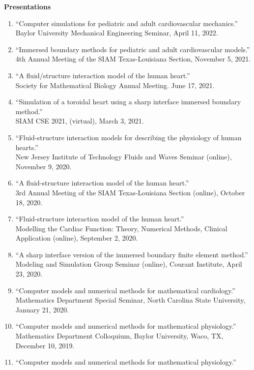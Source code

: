 \documentclass{article} %
\begin{document}
\vspace{0.5cm}
\noindent
{\bf \large Presentations}
\begin{enumerate}
\item ``Computer simulations for pediatric and adult cardiovascular mechanics.'' \\
Baylor University Mechanical Engineering Seminar, April 11, 2022.
\item ``Immersed boundary methods for pediatric and adult cardiovascular models.''\\
4th Annual Meeting of the SIAM Texas-Louisiana Section, November 5, 2021.
\item ``A fluid/structure interaction model of the human heart.'' \\
Society for Mathematical Biology Annual Meeting.  June 17, 2021.
\item ``Simulation of a toroidal heart using a sharp interface immersed boundary method.'' \\
SIAM CSE 2021, (virtual), March 3, 2021.
\item ``Fluid-structure interaction models for describing the physiology of human hearts.'' \\ New Jersey Institute of Technology Fluids and Waves Seminar (online), November 9, 2020.
\item ``A fluid-structure interaction model of the human heart.'' \\ 3rd Annual Meeting of the SIAM Texas-Louisiana Section (online), October 18, 2020.
\item ``Fluid-structure interaction model of the human heart.'' \\
Modelling the Cardiac Function: Theory, Numerical Methods, Clinical Application (online), September 2, 2020.
\item ``A sharp interface version of the immersed boundary finite element method.'' \\
Modeling and Simulation Group Seminar (online), Courant Institute, April 23, 2020.
\item ``Computer models and numerical methods for mathematical cardiology.'' \\
Mathematics Department Special Seminar, North Carolina State University, January 21, 2020.
\item ``Computer models and numerical methods for mathematical physiology.'' \\
Mathematics Department Colloquium, Baylor University, Waco, TX, December 10, 2019.
\item ``Computer models and numerical methods for mathematical physiology.'' \\

\end{enumerate}
\end{document}
